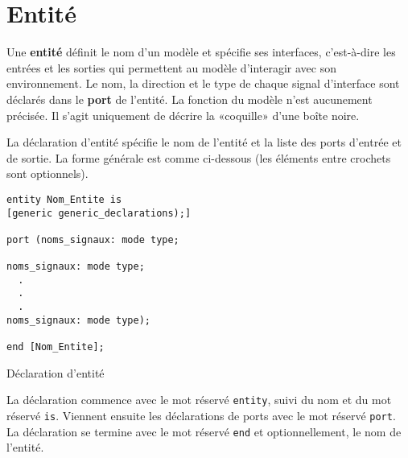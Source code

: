 \documentclass[letter, oneside]{book}
\begin{document}
\section{Entité}
\label{sec:orgbfb8fc2}

Une \textbf{entité} définit le nom d'un modèle et spécifie ses interfaces,
c'est-à-dire les entrées et les sorties qui permettent au modèle
d'interagir avec son environnement. Le nom, la direction et le type
de chaque signal d'interface sont déclarés dans le \textbf{port} de
l'entité. La fonction du modèle n'est aucunement précisée. Il s'agit
uniquement de décrire la «coquille» d'une boîte noire.

La déclaration d'entité spécifie le nom de l'entité et la liste des
ports d'entrée et de sortie. La forme générale est comme ci-dessous (les
éléments entre crochets sont optionnels). 

\begin{listing}[htbp]
\begin{verbatim}
entity Nom_Entite is 
[generic generic_declarations);]

port (noms_signaux: mode type;

noms_signaux: mode type;
  .
  .
  .
noms_signaux: mode type);

end [Nom_Entite];
\end{verbatim}
\caption{Déclaration d'entité}
\end{listing}

La déclaration commence avec le mot réservé \texttt{entity}, suivi du nom et
du mot réservé \texttt{is}. Viennent ensuite les déclarations de ports avec le
mot réservé \texttt{port}. La déclaration se termine avec le mot réservé
\texttt{end} et optionnellement, le nom de l'entité.
\end{document}

